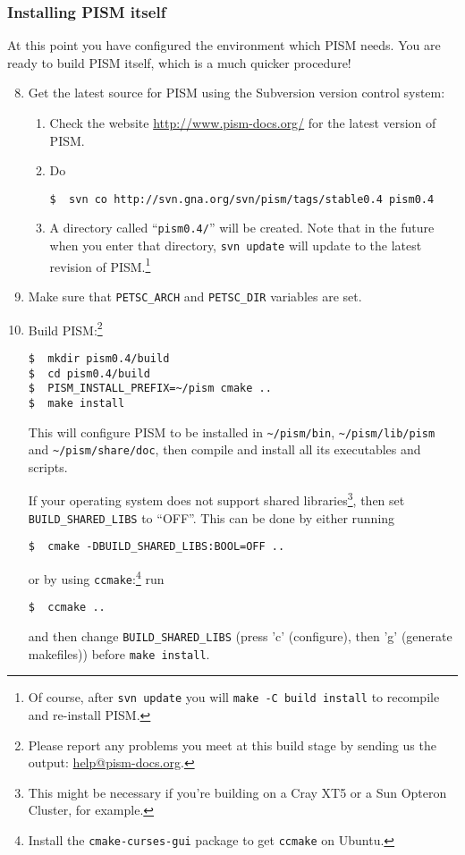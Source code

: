\documentclass[11pt,final]{amsart}
\renewcommand{\t}[1]{\texttt{#1}}
\begin{document}
\subsubsection{Installing PISM itself}
\label{sec:install-cmake}
At this point you have configured the environment which PISM needs.  You are ready to build PISM itself, which is a much quicker procedure!

\begin{enumerate}\setcounter{enumi}{7}
\item Get the latest source for PISM using the Subversion version control system:
\begin{enumerate}
\item \label{getPISMstep} Check the website \url{http://www.pism-docs.org/} for the latest version of PISM.
\item Do
\begin{verbatim}
$  svn co http://svn.gna.org/svn/pism/tags/stable0.4 pism0.4
\end{verbatim}
\item A directory called ``\texttt{pism0.4/}'' will be created.  Note that in the future when you enter that directory,
  \texttt{svn update} will update to the latest revision of PISM.\footnote{Of course, after \t{svn update} you will \t{make -C
      build install} to recompile and re-install PISM.}
\end{enumerate}

\item Make sure that \texttt{PETSC_ARCH} and \texttt{PETSC_DIR} variables are set.

\item Build PISM:\footnote{Please report any problems you meet at this build stage by sending us the output: \href{mailto:help@pism-docs.org}{help@pism-docs.org}.}
\begin{verbatim}
$  mkdir pism0.4/build
$  cd pism0.4/build
$  PISM_INSTALL_PREFIX=~/pism cmake ..
$  make install
\end{verbatim}%

  This will configure PISM to be installed in \texttt{\textasciitilde/pism/bin}, \texttt{\textasciitilde/pism/lib/pism} and \texttt{\textasciitilde/pism/share/doc}, then
  compile and install all its executables and scripts.

If your operating system does not support shared libraries\footnote{This might be necessary if you're building on a Cray XT5 or a Sun Opteron Cluster, for example.}, then set \texttt{BUILD_SHARED_LIBS} to ``OFF''. This can be done by
either running
\begin{verbatim}
$  cmake -DBUILD_SHARED_LIBS:BOOL=OFF ..
\end{verbatim}%
or by using \texttt{ccmake}:\footnote{Install the \texttt{cmake-curses-gui} package to get \texttt{ccmake} on Ubuntu.} run
\begin{verbatim}
$  ccmake ..
\end{verbatim}%
and then change \texttt{BUILD_SHARED_LIBS} (press 'c' (configure), then 'g' (generate makefiles))
before \texttt{make install}.


\end{enumerate}
\end{document}

